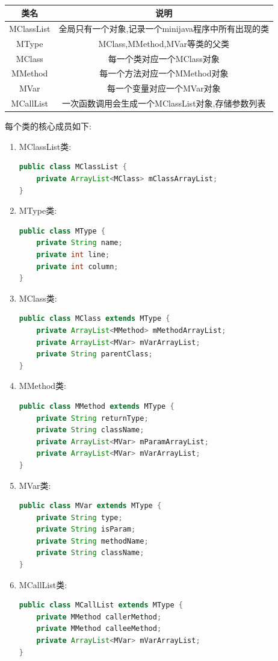 \documentclass[11pt, oneside]{article}   	%
\begin{document}
\begin{spacing}{1.55}
	\paragraph{}
	\begin{table}[!hbp]
	\begin{tabular}{c|c}
	\hline
	类名 & 说明 \\
	\hline
	MClassList & 全局只有一个对象,记录一个minijava程序中所有出现的类 \\
	\hline
	MType & MClass,MMethod,MVar等类的父类 \\
	\hline
	MClass & 每一个类对应一个MClass对象 \\
	\hline
	MMethod & 每一个方法对应一个MMethod对象 \\
	\hline
	MVar & 每一个变量对应一个MVar对象 \\
	\hline
	MCallList & 一次函数调用会生成一个MClassList对象,存储参数列表 \\
	\hline
	\end{tabular}
	\end{table}
	每个类的核心成员如下:
	\begin{enumerate}
	\item MClassList类:
	\begin{lstlisting}[language=Java]
public class MClassList {
	private ArrayList<MClass> mClassArrayList;
}
	\end{lstlisting}
	\item MType类:
	\begin{lstlisting}[language=Java]
public class MType {
	private String name;
	private int line;
	private int column;
}
	\end{lstlisting}
	\item MClass类:
	\begin{lstlisting}[language=Java]
public class MClass extends MType {
	private ArrayList<MMethod> mMethodArrayList;
	private ArrayList<MVar> mVarArrayList;
	private String parentClass;
} 
	\end{lstlisting}
	\item MMethod类:
	\begin{lstlisting}[language=Java]
public class MMethod extends MType {
	private String returnType;
	private String className;
	private ArrayList<MVar> mParamArrayList;
	private ArrayList<MVar> mVarArrayList;
}
	\end{lstlisting}
	\item MVar类:
	\begin{lstlisting}[language=Java]
public class MVar extends MType {
	private String type;
	private String isParam;
	private String methodName;
	private String className;
}
	\end{lstlisting}
	\item MCallList类:
	\begin{lstlisting}[language=Java]
public class MCallList extends MType {
	private MMethod callerMethod;
	private MMethod calleeMethod;
	private ArrayList<MVar> mVarArrayList;
}
	\end{lstlisting}
	\end{enumerate}

\end{spacing}
\end{document}
